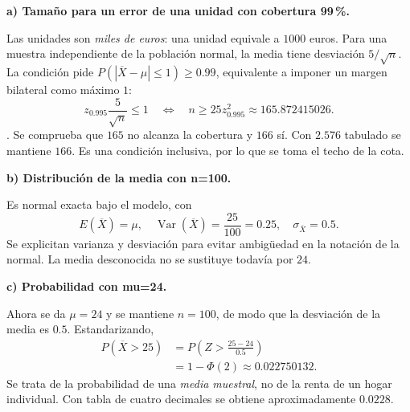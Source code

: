\textbf{a) Tamaño para un error de una unidad con cobertura 99\,\%.}\par\nopagebreak[4]
Las unidades son \emph{miles de euros}: una unidad equivale a $1000$ euros. Para una muestra independiente de la población normal, la media tiene desviación $5/\sqrt n$. La condición pide $P(|\overline X-\mu|\leq1)\geq0.99$, equivalente a imponer un margen bilateral como máximo $1$:
\[
z_{0.995}\frac5{\sqrt n}\leq1
\quad\Longleftrightarrow\quad
n\geq25z_{0.995}^2\approx165.872415026.
\]
. Se comprueba que $165$ no alcanza la cobertura y $166$ sí. Con $2.576$ tabulado se mantiene $166$. Es una condición inclusiva, por lo que se toma el techo de la cota.

\textbf{b) Distribución de la media con n=100.}\par\nopagebreak[4]
Es normal exacta bajo el modelo, con
\[
\boxed{E(\overline X)=\mu,\quad\operatorname{Var}(\overline X)=\frac{25}{100}=0.25,
\quad\sigma_{\overline X}=0.5.}
\]
Se explicitan varianza y desviación para evitar ambigüedad en la notación de la normal. La media desconocida no se sustituye todavía por $24$.

\textbf{c) Probabilidad con mu=24.}\par\nopagebreak[4]
Ahora se da $\mu=24$ y se mantiene $n=100$, de modo que la desviación de la media es $0.5$. Estandarizando,
\[
\begin{aligned}
P(\overline X>25)&=P\left(Z>\frac{25-24}{0.5}\right)\\
&=1-\Phi(2)\approx\boxed{0.022750132}.
\end{aligned}
\]
Se trata de la probabilidad de una \emph{media muestral}, no de la renta de un hogar individual. Con tabla de cuatro decimales se obtiene aproximadamente $0.0228$.
